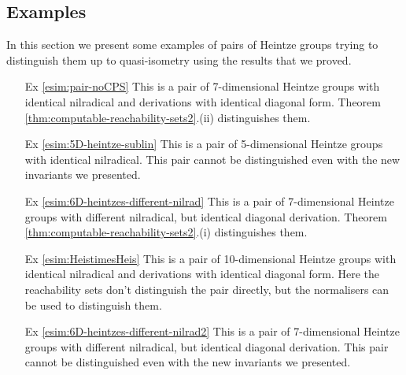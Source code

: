 \documentclass[a4paper,12pt]{amsart}
\theoremstyle{plain}
\theoremstyle{definition}
\theoremstyle{plain}
\theoremstyle{remark}
\begin{document}
\subsection{Examples}

\label{sec:examples_heintze}

In this section we present some examples of pairs of Heintze groups
trying to distinguish them up to quasi-isometry
using the results that we proved. 
\begin{itemize}
	\item[Ex \ref{esim:pair-noCPS}] This is a pair of 7-dimensional Heintze groups with identical nilradical and derivations with identical diagonal form. Theorem \ref{thm:computable-reachability-sets2}.(ii) distinguishes them.
		\item[Ex \ref{esim:5D-heintze-sublin}] This is a pair of 5-dimensional Heintze groups with identical nilradical. This pair cannot be distinguished even with the new invariants we presented.
	\item[Ex \ref{esim:6D-heintzes-different-nilrad}] This is a pair of 7-dimensional Heintze groups with different nilradical, but identical diagonal derivation. Theorem \ref{thm:computable-reachability-sets2}.(i) distinguishes them.
	\item[Ex \ref{esim:HeistimesHeis}] 
	This is a pair of 10-dimensional Heintze groups with identical nilradical and derivations with identical diagonal form. Here the reachability sets don't distinguish the pair directly, but the normalisers can be used to distinguish them.
	\item[Ex \ref{esim:6D-heintzes-different-nilrad2}] This is a pair of 7-dimensional Heintze groups with different nilradical, but identical diagonal derivation. This pair cannot be distinguished even with the new invariants we presented.
\end{itemize}
\end{document}
